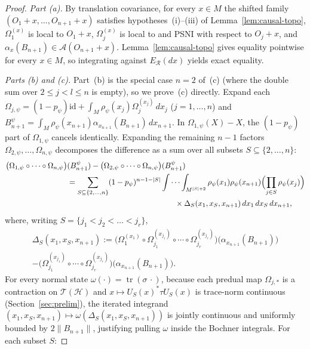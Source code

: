 \documentclass[11pt,a4paper]{article}
\theoremstyle{definition}
\theoremstyle{remark}
\newcommand{\HH}{\mathcal{H}}
\newcommand{\TT}{\mathcal{T}}
\newcommand{\Ac}{\mathcal{A}}
\newcommand{\Rf}{\mathscr{R}}
\newcommand{\id}{\mathrm{id}}
\newcommand{\tr}{\operatorname{tr}}
\newcommand{\norm}[1]{\|#1\|}
\begin{document}
\begin{proof}
\emph{Part (a).} By translation covariance, for every $x\in M$ the shifted family $(O_1+x,\dots,O_{n+1}+x)$ satisfies hypotheses~(i)--(iii) of Lemma~\ref{lem:causal-topo}, $\Omega_1^{(x)}$ is local to $O_1+x$, $\Omega_j^{(x)}$ is local to and PSNI with respect to $O_j+x$, and $\alpha_x(B_{n+1})\in\Ac(O_{n+1}+x)$. Lemma~\ref{lem:causal-topo} gives equality pointwise for every $x\in M$, so integrating against $E_\Rf(dx)$ yields exact equality.

\smallskip\noindent\emph{Parts (b) and (c).} Part~(b) is the special case $n=2$ of~(c) (where the double sum over $2\le j<l\le n$ is empty), so we prove~(c) directly. Expand each $\Omega_{j,\psi} = (1-p_\psi)\id + \int_M \rho_\psi(x_j)\Omega_j^{(x_j)}\,dx_j$ ($j=1,\dots,n$) and $B_{n+1}^\psi = \int_M \rho_\psi(x_{n+1})\alpha_{x_{n+1}}(B_{n+1})\,dx_{n+1}$. In $\Omega_{1,\psi}(X) - X$, the $(1-p_\psi)$ part of $\Omega_{1,\psi}$ cancels identically. Expanding the remaining $n-1$ factors $\Omega_{2,\psi},\dots,\Omega_{n,\psi}$ decomposes the difference as a sum over all subsets $S\subseteq\{2,\dots,n\}$:
\begin{equation}\label{eq:subset-exp}
\begin{aligned}
\bigl(\Omega_{1,\psi}\circ\cdots\circ\Omega_{n,\psi}\bigr)&(B_{n+1}^\psi) - \bigl(\Omega_{2,\psi}\circ\cdots\circ\Omega_{n,\psi}\bigr)(B_{n+1}^\psi) \\
&= \sum_{S\subseteq\{2,\dots,n\}} (1-p_\psi)^{n-1-|S|} \idotsint_{M^{|S|+2}} \rho_\psi(x_1)\rho_\psi(x_{n+1})\Bigl(\prod_{j\in S}\rho_\psi(x_j)\Bigr) \\
&\qquad\qquad\qquad\qquad\qquad\qquad\qquad \times \Delta_S(x_1, x_S, x_{n+1})\,dx_1\,dx_S\,dx_{n+1},
\end{aligned}
\end{equation}
where, writing $S = \{j_1 < j_2 < \dots < j_r\}$,
\begin{multline*}
\Delta_S(x_1, x_S, x_{n+1}) := \bigl(\Omega_1^{(x_1)}\circ\Omega_{j_1}^{(x_{j_1})}\circ\cdots\circ\Omega_{j_r}^{(x_{j_r})}\bigr)\bigl(\alpha_{x_{n+1}}(B_{n+1})\bigr) \\
- \bigl(\Omega_{j_1}^{(x_{j_1})}\circ\cdots\circ\Omega_{j_r}^{(x_{j_r})}\bigr)\bigl(\alpha_{x_{n+1}}(B_{n+1})\bigr).
\end{multline*}
For every normal state $\omega(\cdot)=\tr(\sigma\,\cdot)$, because each predual map $\Omega_{j,*}$ is a contraction on $\TT(\HH)$ and $x\mapsto U_S(x)^*\tau U_S(x)$ is trace-norm continuous (Section~\ref{sec:prelim}), the iterated integrand $(x_1,x_S,x_{n+1})\mapsto\omega(\Delta_S(x_1,x_S,x_{n+1}))$ is jointly continuous and uniformly bounded by $2\norm{B_{n+1}}$, justifying pulling $\omega$ inside the Bochner integrals. For each subset $S$:

\end{proof}
\end{document}
